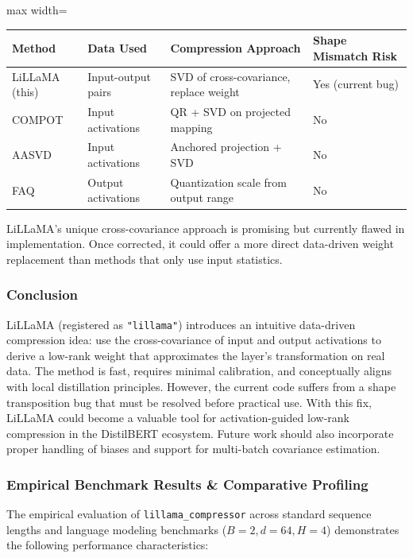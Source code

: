 \begin{center}
\begin{adjustbox}{max width=\columnwidth}
\renewcommand{\arraystretch}{1.2}
\begin{tabular}{llll}
\toprule
Method & Data Used & Compression Approach & Shape Mismatch Risk \\
\midrule
LiLLaMA (this) & Input-output pairs & SVD of cross-covariance, replace weight & Yes (current bug) \\
COMPOT & Input activations & QR + SVD on projected mapping & No \\
AASVD & Input activations & Anchored projection + SVD & No \\
FAQ & Output activations & Quantization scale from output range & No \\

\bottomrule
\end{tabular}
\end{adjustbox}
\end{center}
LiLLaMA's unique cross-covariance approach is promising but currently flawed in implementation. Once corrected, it could offer a more direct data-driven weight replacement than methods that only use input statistics.


\subsubsection*{Conclusion}

LiLLaMA (registered as \texttt{"lillama"}) introduces an intuitive data-driven compression idea: use the cross-covariance of input and output activations to derive a low-rank weight that approximates the layer's transformation on real data. The method is fast, requires minimal calibration, and conceptually aligns with local distillation principles. However, the current code suffers from a shape transposition bug that must be resolved before practical use. With this fix, LiLLaMA could become a valuable tool for activation-guided low-rank compression in the DistilBERT ecosystem. Future work should also incorporate proper handling of biases and support for multi-batch covariance estimation.

\subsubsection*{Empirical Benchmark Results \& Comparative Profiling}

The empirical evaluation of \texttt{lillama\_compressor} across standard sequence lengths and language modeling benchmarks ($B=2, d=64, H=4$) demonstrates the following performance characteristics:


